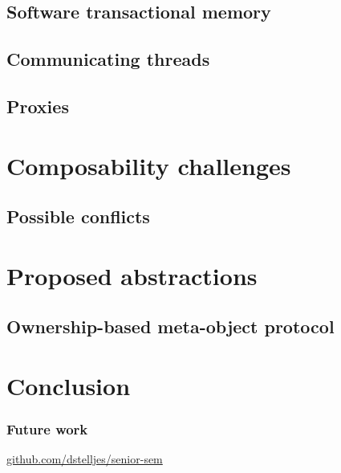 \documentclass{beamer}
\begin{document}
  \subsection{Software transactional memory}

  \begin{frame}
  \end{frame}

  \subsection{Communicating threads}

  \begin{frame}
  \end{frame}

  \subsection{Proxies}

  \begin{frame}
  \end{frame}

  \section{Composability challenges}

  \subsection{Possible conflicts}

  \section{Proposed abstractions}

  \subsection{Ownership-based meta-object protocol}

  \section{Conclusion}

  \begin{frame}
    \frametitle{Future work}
  \end{frame}

  \begin{frame}[standout]
    \centering

    \url{github.com/dstelljes/senior-sem}

    \vfill

    \ccbyncsa{}
  \end{frame}
\end{document}
